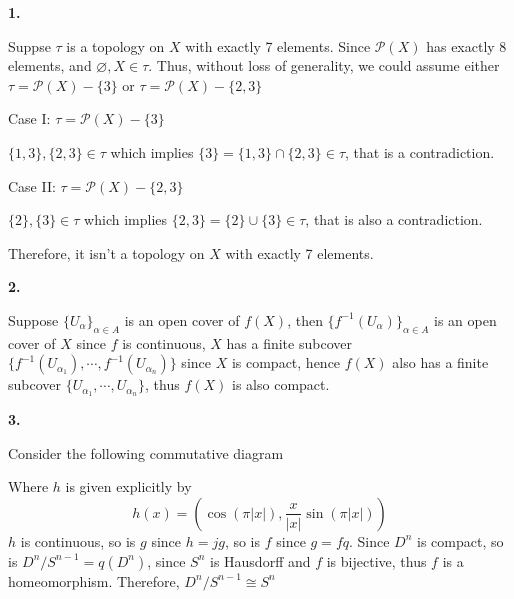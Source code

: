 \documentclass[../main.tex]{subfiles}
\begin{document}
\textbf{1.} \par\noindent
Suppse $\tau$ is a topology on $X$ with exactly 7 elements. Since $\mathscr{P}(X)$ has exactly 8 elements, and $\varnothing,X \in\tau$. Thus, without loss of generality, we could assume either $\tau = \mathscr{P}(X)-\{3\}$ or $\tau = \mathscr{P}(X)-\{2,3\}$ \par\noindent
Case I: $\tau = \mathscr{P}(X)-\{3\}$ \par\noindent
$ \{1,3\},\{2,3\}\in\tau $ which implies $ \{3\} = \{1,3\}\cap \{2,3\} \in \tau $, that is a contradiction. \par\noindent
Case II: $\tau = \mathscr{P}(X)-\{2,3\}$ \par\noindent
$ \{2\},\{3\}\in\tau $ which implies $ \{2,3\} = \{2\}\cup \{3\} \in \tau $, that is also a contradiction. \par\noindent
Therefore, it isn't a topology on $X$ with exactly 7 elements. \par\par\noindent
\textbf{2.} \par\noindent
Suppose $\{U_{\alpha}\}_{\alpha\in A}$ is an open cover of $f(X)$, then $\{f^{-1}(U_{\alpha})\}_{\alpha\in A}$ is an open cover of $X$ since $f$ is continuous, $X$ has a finite subcover $\{f^{-1}(U_{\alpha_{1}}),\cdots,f^{-1}(U_{\alpha_{n}})\}$ since $X$ is compact, hence $f(X)$ also has a finite subcover $\{U_{\alpha_{1}},\cdots,U_{\alpha_{n}}\}$, thus $f(X)$ is also compact. \par\par\noindent
\textbf{3.} \par\noindent
Consider the following commutative diagram
\begin{center}
\end{center}
\par\noindent
Where $h$ is given explicitly by
$$ h(x) = \left(\cos{\left(\pi|x|\right)},\dfrac{x}{|x|}\sin{\left(\pi|x|\right)}\right) $$
$h$ is continuous, so is $g$ since $h=jg$, so is $f$ since $g=fq$.
Since $D^{n}$ is compact, so is $D^{n}/S^{n-1}=q(D^{n})$, since $S^{n}$ is Hausdorff and $f$ is bijective, thus $f$ is a homeomorphism. Therefore, $D^{n}/S^{n-1}\cong S^{n}$ \par\par\noindent
\end{document}

